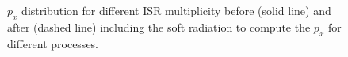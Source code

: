 \begin{figure}[htbp]
   \centering
    \\
    \\
   \caption{$p_x$ distribution for different ISR multiplicity before (solid line) and after (dashed line) including the soft radiation to compute the $p_x$ for different processes.}
   \label{fig:Adx4:HH:MET}
\end{figure}